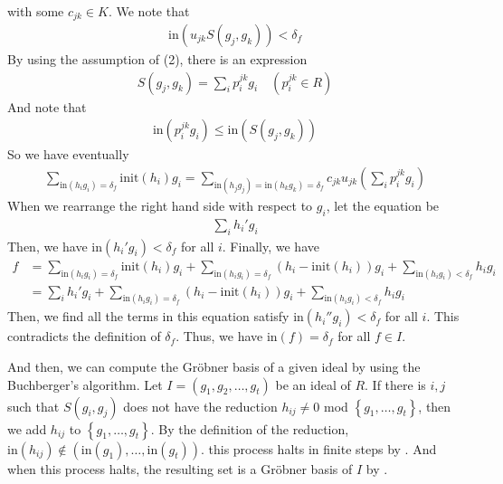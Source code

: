 \documentclass{article}
\begin{document}
\begin{pfsp}
\begin{align}
    \end{align}
    with some $c_{jk} \in K$. We note that
    \begin{align}
        \mathrm{in}(u_{jk} S(g_j, g_k)) < \delta_f
    \end{align}
    By using the assumption of (2), there is an expression
    \begin{align}
        S(g_j, g_k) = \sum_i p_i^{jk} g_i \quad (p_i^{jk} \in R)
    \end{align}
    And note that 
    \begin{align}
        \mathrm{in}(p_i^{jk} g_i) \leq \mathrm{in}(S(g_j, g_k))
    \end{align}
    So we have eventually
    \begin{align}
        \sum_{\mathrm{in}(h_i g_i) = \delta_f} \mathrm{init}(h_i) g_i = \sum_{\mathrm{in}(h_j g_j) = \mathrm{in}(h_k g_k) = \delta_f} c_{jk} u_{jk} \left( \sum_i p_i^{jk} g_i \right)
    \end{align}
    When we rearrange the right hand side with respect to $g_i$, let the equation be
    \begin{align}
        \sum_i h_i' g_i
    \end{align}
    Then, we have $\mathrm{in}(h_i' g_i) < \delta_f$ for all $i$. Finally, we have
    \begin{align}
        f &= \sum_{\mathrm{in}(h_i g_i) = \delta_f} \mathrm{init}(h_i) g_i + \sum_{\mathrm{in}(h_i g_i) = \delta_f} (h_i - \mathrm{init}(h_i)) g_i + \sum_{\mathrm{in}(h_i g_i) < \delta_f} h_i g_i \\ 
        &= \sum_i h_i' g_i + \sum_{\mathrm{in}(h_i g_i) = \delta_f} (h_i - \mathrm{init}(h_i)) g_i + \sum_{\mathrm{in}(h_i g_i) < \delta_f} h_i g_i
    \end{align}
    Then, we find all the terms in this equation satisfy $\mathrm{in}(h_i'' g_i) < \delta_f$ for all $i$. This contradicts the definition of $\delta_f$. Thus, we have $\mathrm{in}(f) = \delta_f$ for all $f \in I$. 
\end{pfsp}

And then, we can compute the Gr\"{o}bner basis of a given ideal by using the Buchberger's algorithm. Let $I = (g_1, g_2, \ldots, g_t)$ be an ideal of $R$. If there is $i,j$ such that $S(g_i, g_j)$ does not have the reduction $h_{ij} \neq 0$ mod $\left\{ g_1, \ldots, g_t \right\}$, then we add $h_{ij}$ to $\left\{ g_1, \ldots, g_t \right\}$. By the definition of the reduction, $\mathrm{in}(h_{ij}) \notin (\mathrm{in}(g_1), \ldots, \mathrm{in}(g_t))$. this process halts in finite steps by . And when this process halts, the resulting set is a Gr\"{o}bner basis of $I$ by .

\newpage 

{}

\end{document}
